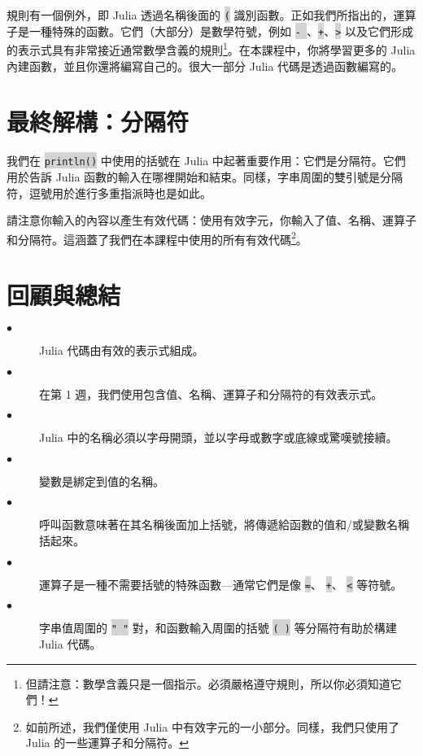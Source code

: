 \documentclass[]{article}
\begin{document}
規則有一個例外，即 Julia 透過名稱後面的 \colorbox{lightgray}{\tt (} 識別函數。正如我們所指出的，運算子是一種特殊的函數。它們（大部分）是數學符號，例如 \colorbox{lightgray}{\tt - }、\colorbox{lightgray}{\tt +}、\colorbox{lightgray}{\tt >} 以及它們形成的表示式具有非常接近通常數學含義的規則\footnote{但請注意：數學含義只是一個指示。必須嚴格遵守規則，所以你必須知道它們！}。在本課程中，你將學習更多的 Julia 內建函數，並且你還將編寫自己的。很大一部分 Julia 代碼是透過函數編寫的。

\section*{最終解構：分隔符}

我們在 \colorbox{lightgray}{\tt println()} 中使用的括號在 Julia 中起著重要作用：它們是分隔符。它們用於告訴 Julia 函數的輸入在哪裡開始和結束。同樣，字串周圍的雙引號是分隔符，逗號用於進行多重指派時也是如此。

請注意你輸入的內容以產生有效代碼：使用有效字元，你輸入了值、名稱、運算子和分隔符。這涵蓋了我們在本課程中使用的所有有效代碼\footnote{如前所述，我們僅使用 Julia 中有效字元的一小部分。同樣，我們只使用了 Julia 的一些運算子和分隔符。}。

\section*{回顧與總結}

\begin{description}
	\item[$\bullet$] Julia 代碼由有效的表示式組成。
	\item[$\bullet$] 在第 1 週，我們使用包含值、名稱、運算子和分隔符的有效表示式。
	\item[$\bullet$] Julia 中的名稱必須以字母開頭，並以字母或數字或底線或驚嘆號接續。
	\item[$\bullet$] 變數是綁定到值的名稱。
	\item[$\bullet$] 呼叫函數意味著在其名稱後面加上括號，將傳遞給函數的值和/或變數名稱括起來。
	\item[$\bullet$] 運算子是一種不需要括號的特殊函數---通常它們是像 \colorbox{lightgray}{\tt =}、 \colorbox{lightgray}{\tt +}、 \colorbox{lightgray}{\tt <} 等符號。
	\item[$\bullet$] 字串值周圍的 \colorbox{lightgray}{\tt " "} 對，和函數輸入周圍的括號 \colorbox{lightgray}{\tt ( )} 等分隔符有助於構建 Julia 代碼。
\end{description}
\end{document}
